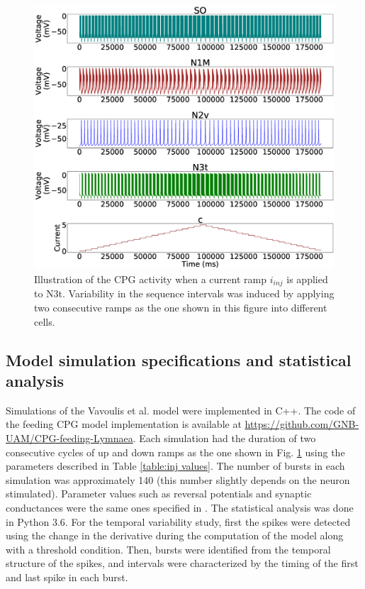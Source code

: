 \begin{figure}[h!]
    \centering
    \includegraphics[width=\textwidth]{img/methods-paper-modelo/figure3.eps}
    \caption{Illustration of the CPG activity when a current ramp \(i_{inj}\) is applied to N3t. Variability in the sequence intervals was induced by applying two consecutive ramps as the one shown in this figure into different cells.  }
    \label{fig:complete ramp example}
\end{figure}


\subsection{Model simulation specifications and statistical analysis}
Simulations of the Vavoulis et al. model \cite{Vavoulis2007} were implemented in C++. The code of the feeding CPG model implementation is available at \href{github.com/GNB-UAM/CPG-feeding-Lymnaea}{https://github.com/GNB-UAM/CPG-feeding-Lymnaea}. Each simulation had the duration of two consecutive cycles of up and down ramps as the one shown in Fig. \ref{fig:complete ramp example} using the parameters described in Table \ref{table:inj values}. The number of bursts in each simulation was approximately 140 (this number slightly depends on the neuron stimulated). Parameter values such as reversal potentials and synaptic conductances were the same ones specified in \cite{Vavoulis2007}.
The statistical analysis was done in Python 3.6. For the temporal variability study, first the spikes were detected %
using the change in the derivative during the computation of the model along with a threshold condition. Then, bursts were identified from the temporal structure of the spikes, and intervals were characterized by the timing of the first and last spike in each burst. 

